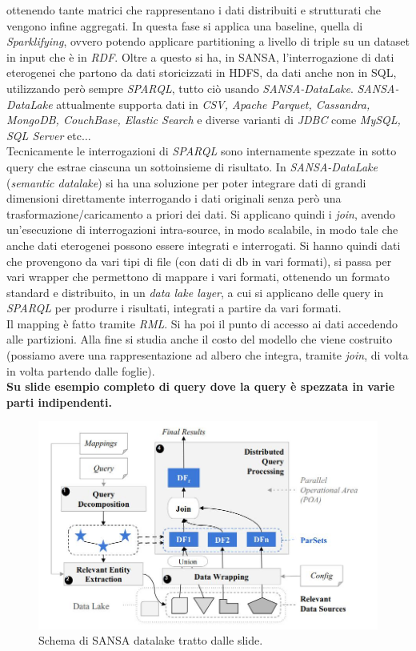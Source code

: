 \documentclass[a4paper,12pt, oneside]{book}
\begin{document}
ottenendo tante matrici che rappresentano i dati distribuiti e strutturati che
vengono infine aggregati. In questa fase si applica una baseline, quella di
\textit{Sparklifying}, ovvero potendo applicare partitioning a livello di triple
su un dataset in input che è in \textit{RDF}. Oltre a questo si ha, in SANSA,
l'interrogazione di dati eterogenei che partono da dati storicizzati in HDFS, da
dati anche non in SQL, utilizzando però sempre \textit{SPARQL}, tutto ciò usando
\textit{SANSA-DataLake}. \textit{SANSA-DataLake} attualmente supporta dati in
\textit{CSV, Apache Parquet, Cassandra, MongoDB, CouchBase, Elastic Search} e
diverse varianti di \textit{JDBC} come \textit{MySQL, SQL Server} etc$\ldots$\\
Tecnicamente le interrogazioni di \textit{SPARQL} sono internamente spezzate in
sotto query che estrae ciascuna un sottoinsieme di risultato. In
\textit{SANSA-DataLake} (\textit{semantic datalake}) si ha una soluzione per
poter integrare dati di grandi dimensioni direttamente interrogando i dati
originali senza però una trasformazione/caricamento a priori dei dati. Si
applicano quindi i \textit{join}, avendo un'esecuzione di interrogazioni
intra-source, in modo scalabile, in modo tale che anche dati eterogenei possono
essere integrati e interrogati. Si hanno quindi dati che provengono da vari tipi
di file (con dati di db in vari formati), si passa per vari wrapper che
permettono di mappare i vari formati, ottenendo un formato standard e
distribuito, in un \textit{data lake layer}, a cui si applicano delle query in
\textit{SPARQL} per produrre i risultati, integrati a partire da vari formati.\\
Il mapping è fatto tramite \textit{RML}. Si ha poi il punto di accesso ai dati
accedendo alle partizioni. Alla fine si studia anche il costo del modello che
viene costruito (possiamo avere una rappresentazione ad albero che integra,
tramite \textit{join}, di volta in volta partendo dalle foglie).\\
\textbf{Su slide esempio completo di query dove la query è spezzata in varie
  parti indipendenti.}\\
\begin{figure}
  \centering
  \includegraphics[scale = 0.4]{img/sansa.jpg}
  \caption{Schema di SANSA datalake tratto dalle slide.}
\end{figure}
\end{document}
